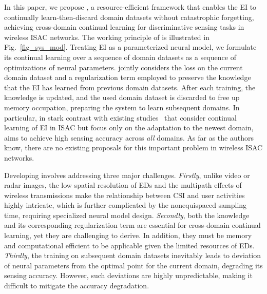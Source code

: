 In this paper, we propose \emph{\name}, a resource-efficient framework that enables the EI to continually learn-then-discard domain datasets without catastrophic forgetting, achieving cross-domain continual learning for discriminative sensing tasks in wireless ISAC networks.
The working principle of \name is illustrated in Fig.~\ref{fig_sys_mod}.
Treating EI as a parameterized neural model, we formulate its continual learning over a sequence of domain datasets as a sequence of optimizations of neural parameters.
\name jointly considers the loss on the current domain dataset and a regularization term employed to preserve the knowledge that the EI has learned from previous domain datasets.
After each training, the knowledge is updated, and the used domain dataset is discarded to free up memory occupation, preparing the system to learn subsequent domains.
In particular, in stark contrast with existing studies~\cite{Hu23ICC_Digital, Ji22MobiSys_SiFall} that consider continual learning of EI in ISAC but focus only on the adaptation to the newest domain, \name aims to achieve high sensing accuracy across \emph{all} domains.
As far as the authors know, there are no existing proposals for this important problem in wireless ISAC networks.


Developing \name involves addressing three major challenges.
\emph{Firstly}, unlike video or radar images, the low spatial resolution of EDs and the multipath effects of wireless transmissions make the relationship between CSI and user activities highly intricate, which is further complicated by the nonequispaced sampling time, requiring specialized neural model design.
\emph{Secondly}, both the knowledge and its corresponding regularization term are essential for cross-domain continual learning, yet they are challenging to derive. 
In addition, they must be memory and computational efficient to be applicable given the limited resources of EDs.
\emph{Thirdly}, the training on subsequent domain datasets inevitably leads to deviation of neural parameters from the optimal point for the current domain, degrading its sensing accuracy.
However, such deviations are highly unpredictable, making it difficult to mitigate the accuracy degradation.


